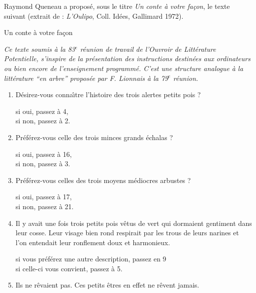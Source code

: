 \addtocounter{section}{1}
Raymond Queneau a propos\'e, sous le titre {\it Un conte \`a votre fa\c con}, le
texte suivant %
(extrait de : {\it L'Oulipo}, Coll. Id\'ees, Gallimard 1972).

{\footnotesize
\begin{multicols}{2}%
{\sc Un conte \`a votre fa\c con}

{\em Ce texte soumis \`a la 83$^{e}$ r\'eunion de travail de l'Ouvroir de
Litt\'erature Potentielle, s'inspire de la pr\'esentation des instructions
destin\'ees aux ordinateurs ou bien encore de l'enseignement programm\'e. C'est
une structure analogue \`a la litt\'erature ``en arbre'' propos\'ee par F. Lionnais
\`a la 79$^{e}$ r\'eunion.}

\begin{enumerate} 
\item D\'esirez-vous conna\^\i tre l'histoire des trois alertes petits pois ?

si oui, passez \`a 4,\\
si non, passez \`a 2.

\item Pr\'ef\'erez-vous celle des trois minces grands \'echalas ?

si oui, passez \`a 16,\\
si non, passez \`a 3.

\item Pr\'ef\'erez-vous celles des trois moyens m\'ediocres arbustes ?

si oui, passez \`a 17,\\
si non, passez \`a 21.

\item Il y avait une fois trois petits pois v\^etus de vert qui dormaient
gentiment dans leur cosse. Leur visage bien rond respirait par les trous de
leurs narines et l'on entendait leur ronflement doux et harmonieux.

si vous pr\'ef\'erez une autre description, passez en 9\\
si celle-ci vous convient, passez \`a 5.

\item Ils ne r\^evaient pas. Ces petits \^etres en effet ne r\^event jamais.


\end{enumerate}
\end{multicols}}

